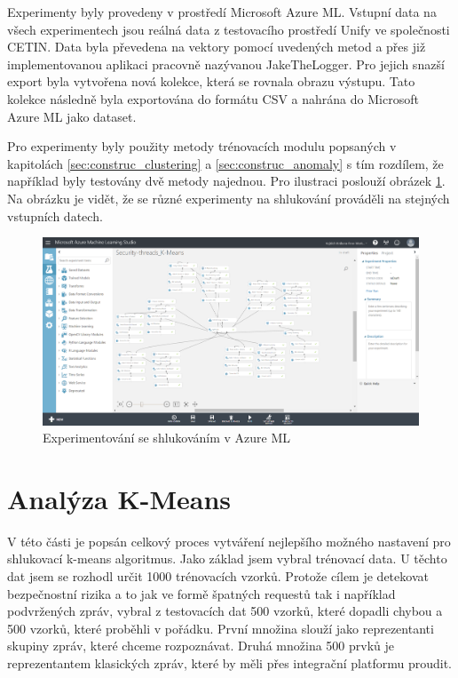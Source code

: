 \documentclass[thesis=M,czech]{FITthesis}[2012/10/20]
\newcommand{\tmpframe}[1]{\fbox{#1}}
\renewcommand{\tmpframe}[1]{#1}
\begin{document}
	Experimenty byly provedeny v prostředí Microsoft Azure ML. Vstupní data na všech experimentech jsou reálná data z testovacího prostředí Unify ve společnosti CETIN. Data byla převedena na vektory pomocí uvedených metod a přes již implementovanou aplikaci pracovně nazývanou JakeTheLogger. Pro jejich snazší export byla vytvořena nová kolekce, která se rovnala obrazu výstupu. Tato kolekce následně byla exportována do formátu CSV a nahrána do Microsoft Azure ML jako dataset.
	
	Pro experimenty byly použity metody trénovacích modulu popsaných v kapitolách \ref{sec:construc_clustering} a \ref{sec:construc_anomaly} s tím rozdílem, že například byly testovány dvě metody najednou. Pro ilustraci poslouží obrázek \ref{fig:azure-experiment}. Na obrázku je vidět, že se různé experimenty na shlukování prováděli na stejných vstupních datech. 
	
	\begin{figure}[htb]\centering
		\tmpframe{\includegraphics[width=\textwidth]{./img/MSAzureExperimentKMeans}}	
		\caption{Experimentování se shlukováním v Azure ML}
		\label{fig:azure-experiment}
	\end{figure}
	
	\section{Analýza K-Means}
		V této části je popsán celkový proces vytváření nejlepšího možného nastavení pro shlukovací k-means algoritmus. Jako základ jsem vybral trénovací data. U těchto dat jsem se rozhodl určit 1000 trénovacích vzorků. Protože cílem je detekovat bezpečnostní rizika a to jak ve formě špatných requestů tak i například podvržených zpráv, vybral z testovacích dat 500 vzorků, které dopadli chybou a 500 vzorků, které proběhli v pořádku. První množina slouží jako reprezentanti skupiny zpráv, které chceme rozpoznávat. Druhá množina 500 prvků je reprezentantem klasických zpráv, které by měli přes integrační platformu proudit.
		
\end{document}
